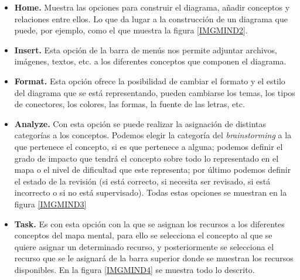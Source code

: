 \documentclass[11pt,a4paper,spanish,twoside]{report}
\begin{document}
        \begin{itemize}
          \item \textbf{Home.} Muestra las opciones para construir el
            diagrama, añadir conceptos y relaciones entre ellos. Lo que da
            lugar a la construcción de un diagrama que puede, por ejemplo,
            como el que muestra la figura \ref{IMGMIND2}.


          \item \textbf{Insert.} Esta opción de la barra de menús nos permite
            adjuntar archivos, imágenes, textos, etc. a los diferentes
            conceptos que componen el diagrama. 

          \item \textbf{Format.} Esta opción ofrece la posibilidad de cambiar
            el formato y el estilo del diagrama que se está representando,
            pueden cambiarse los temas, los tipos de conectores, los colores,
            las formas, la fuente de las letras, etc.

          \item \textbf{Analyze.} Con esta opción se puede realizar la
            asignación de distintas categorías a los conceptos. Podemos
            elegir la categoría del \emph{brainstorming} a la que pertenece
            el concepto, si es que pertenece a alguna; podemos definir el
            grado de impacto que tendrá el concepto sobre todo lo
            representado en el mapa o el nivel de dificultad que este
            representa; por último podemos definir el estado de la revisión
            (si está correcto, si necesita ser revisado, si está incorrecto o
            si no está supervisado). Todas estas opciones se muestran en la
            figura \ref{IMGMIND3}


          \item \textbf{Task.} Es con esta opción con la que se asignan los
            recursos a los diferentes conceptos del mapa mental, para ello se
            selecciona el concepto al que se quiere asignar un determinado
            recurso, y posteriormente se selecciona el recurso que se le
            asignará de la barra superior donde se muestran los recursos
            disponibles. En la figura \ref{IMGMIND4} se muestra todo lo
            descrito.


\end{itemize}
\end{document}
